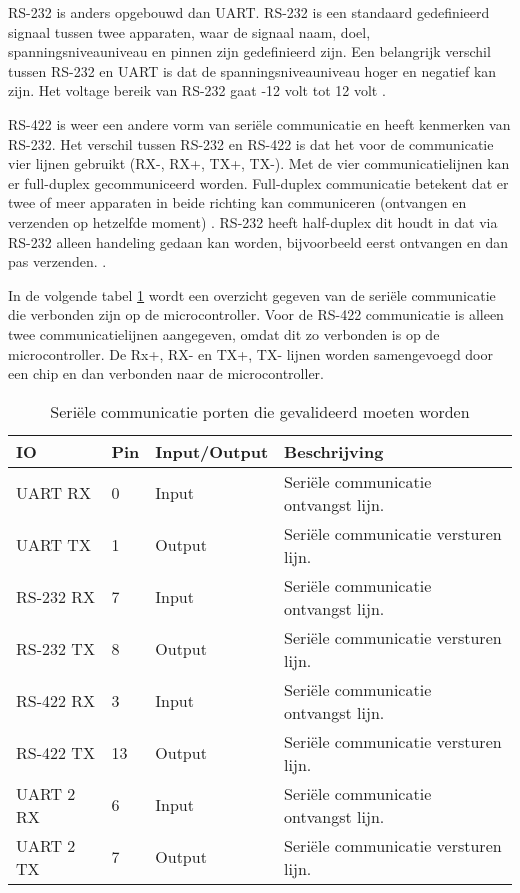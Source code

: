\noindent RS-232 is anders opgebouwd dan UART. RS-232 is een standaard gedefinieerd signaal tussen twee apparaten, waar de signaal naam, doel, spanningsniveauniveau en pinnen zijn gedefinieerd zijn. Een belangrijk verschil tussen RS-232 en UART is dat de spanningsniveauniveau hoger en negatief kan zijn. Het voltage bereik van RS-232 gaat -12 volt tot 12 volt \autocite{RS232}. \newline

\noindent RS-422 is weer een andere vorm van seriële communicatie en heeft kenmerken van RS-232. Het verschil tussen RS-232 en RS-422 is dat het voor de communicatie vier lijnen gebruikt (RX-, RX+, TX+, TX-). Met de vier communicatielijnen kan er full-duplex gecommuniceerd worden. Full-duplex communicatie betekent dat er twee of meer apparaten in beide richting kan communiceren (ontvangen en verzenden op hetzelfde moment) \autocite{FullDuplex}. RS-232 heeft half-duplex dit houdt in dat via RS-232 alleen handeling gedaan kan worden, bijvoorbeeld eerst ontvangen en dan pas verzenden. \autocite{RS422}. \newline

\noindent In de volgende tabel \ref{tab:hw_val_serieel} wordt een overzicht gegeven van de seriële communicatie die verbonden zijn op de microcontroller. Voor de RS-422 communicatie is alleen twee communicatielijnen aangegeven, omdat dit zo verbonden is op de microcontroller. De Rx+, RX- en TX+, TX- lijnen worden samengevoegd door een chip en dan verbonden naar de microcontroller.
\begin{table}[h!]
	\caption{Seriële communicatie porten die gevalideerd moeten worden}
	\begin{tabular}{lllp{12cm}}
	\toprule
\textbf{IO} & \textbf{Pin} & \textbf{Input/Output} & \textbf{Beschrijving}	\\ \toprule
	UART RX		& 0    	& Input		& Seriële communicatie ontvangst lijn.			\\
	UART TX		& 1    	& Output	& Seriële communicatie versturen lijn.			\\
	RS-232 RX	& 7    	& Input		& Seriële communicatie ontvangst lijn.			\\
	RS-232 TX	& 8    	& Output	& Seriële communicatie versturen lijn.			\\
	RS-422 RX	& 3    	& Input		& Seriële communicatie ontvangst lijn.			\\
	RS-422 TX	& 13   	& Output	& Seriële communicatie versturen lijn.			\\
	UART 2 RX	& 6    	& Input		& Seriële communicatie ontvangst lijn.			\\
	UART 2 TX	& 7   	& Output	& Seriële communicatie versturen lijn.			\\ \bottomrule
	\end{tabular}
	\label{tab:hw_val_serieel}
\end{table}